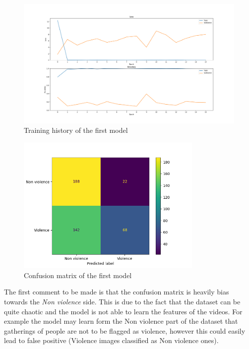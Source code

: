 \begin{figure}[]
    \centering
    \includegraphics[width=1\textwidth]{images/731a-2D3-86ad-history.png}
    \caption{Training history of the first model}
    \label{fig:First2DCNNHistory}
\end{figure}

\begin{figure}[]
    \centering
    \includegraphics[width=0.8\textwidth]{images/731a-2D3-86ad-conf_matrix.png}
    \caption{Confusion matrix of the first model}
    \label{fig:First2DCNNConfusionMatrix}
\end{figure}


The first comment to be made is that the confusion matrix is heavily bias towards the \textit{Non violence} side. This is due to the fact that the dataset can be quite chaotic and the model is not able to learn the features of the videos. For example the model may learn form the Non violence part of the dataset that gatherings of people are not to be flagged as violence, however this could easily lead to false positive (Violence images classified as Non violence ones).

